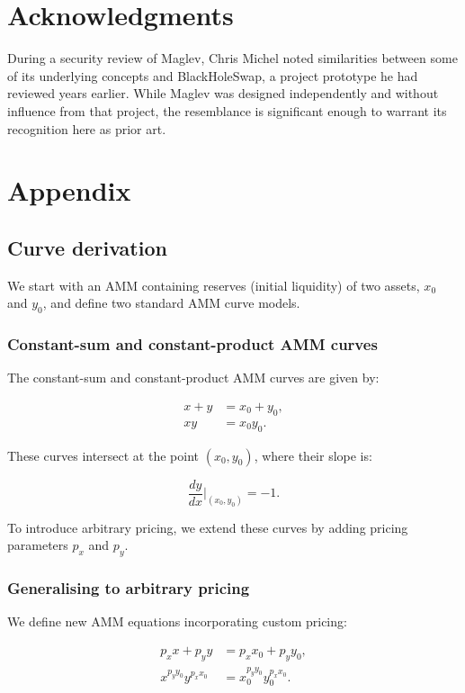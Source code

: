 \documentclass{article}
\begin{document}
\section*{Acknowledgments}

During a security review of Maglev, Chris Michel noted similarities between some of its underlying concepts and BlackHoleSwap, a project prototype he had reviewed years earlier. While Maglev was designed independently and without influence from that project, the resemblance is significant enough to warrant its recognition here as prior art.

\newpage
\section{Appendix}

\subsection{Curve derivation}
\label{sec:curve-derivation}

We start with an AMM containing reserves (initial liquidity) of two assets, \( x_0 \) and \( y_0 \), and define two standard AMM curve models.

\subsubsection{Constant-sum and constant-product AMM curves}

The constant-sum and constant-product AMM curves are given by:

\begin{align}
    x + y &= x_0 + y_0, \\
    xy &= x_0 y_0.
\end{align}

These curves intersect at the point \( (x_0, y_0) \), where their slope is:

\[
\frac{dy}{dx} \Big|_{(x_0, y_0)} = -1.
\]

To introduce arbitrary pricing, we extend these curves by adding pricing parameters \( p_x \) and \( p_y \).

\subsubsection{Generalising to arbitrary pricing}

We define new AMM equations incorporating custom pricing:

\begin{align}
    p_x x + p_y y &= p_x x_0 + p_y y_0, \\
    \label{eq:exponential-form}
    x^{p_y y_0} y^{p_x x_0} &= x_0^{p_y y_0} y_0^{p_x x_0}.
\end{align}
\end{document}
